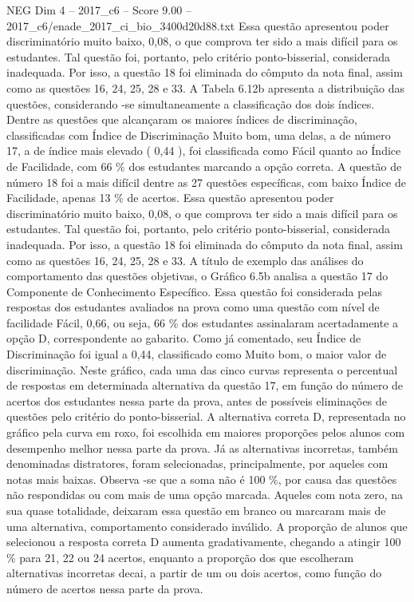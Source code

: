 \begin{textsample}{NEG Dim 4 – 2017\_c6 – Score 9.00 – 2017\_c6/enade\_2017\_ci\_bio\_3400d20d88.txt}
Essa questão apresentou poder discriminatório muito baixo, 0,08, o que comprova ter sido a mais difícil para os estudantes.
Tal questão foi, portanto, pelo critério ponto-bisserial, considerada inadequada.
Por isso, a questão 18 foi eliminada do cômputo da nota final, assim como as questões 16, 24, 25, 28 e 33.
A Tabela 6.12b apresenta a distribuição das questões, considerando -se simultaneamente a classificação dos dois índices.
Dentre as questões que alcançaram os maiores índices de discriminação, classificadas com Índice de Discriminação Muito bom, uma delas, a de número 17, a de índice mais elevado ( 0,44 ), foi classificada como Fácil quanto ao Índice de Facilidade, com 66 \% dos estudantes marcando a opção correta.
A questão de número 18 foi a mais difícil dentre as 27 questões específicas, com baixo Índice de Facilidade, apenas 13 \% de acertos.
Essa questão apresentou poder discriminatório muito baixo, 0,08, o que comprova ter sido a mais difícil para os estudantes.
Tal questão foi, portanto, pelo critério ponto-bisserial, considerada inadequada.
Por isso, a questão 18 foi eliminada do cômputo da nota final, assim como as questões 16, 24, 25, 28 e 33.
A título de exemplo das análises do comportamento das questões objetivas, o Gráfico 6.5b analisa a questão 17 do Componente de Conhecimento Específico.
Essa questão foi considerada pelas respostas dos estudantes avaliados na prova como uma questão com nível de facilidade Fácil, 0,66, ou seja, 66 \% dos estudantes assinalaram acertadamente a opção D, correspondente ao gabarito.
Como já comentado, seu Índice de Discriminação foi igual a 0,44, classificado como Muito bom, o maior valor de discriminação.
Neste gráfico, cada uma das cinco curvas representa o percentual de respostas em determinada alternativa da questão 17, em função do número de acertos dos estudantes nessa parte da prova, antes de possíveis eliminações de questões pelo critério do ponto-bisserial.
A alternativa correta D, representada no gráfico pela curva em roxo, foi escolhida em maiores proporções pelos alunos com desempenho melhor nessa parte da prova.
Já as alternativas incorretas, também denominadas distratores, foram selecionadas, principalmente, por aqueles com notas mais baixas.
Observa -se que a soma não é 100 \%, por causa das questões não respondidas ou com mais de uma opção marcada.
Aqueles com nota zero, na sua quase totalidade, deixaram essa questão em branco ou marcaram mais de uma alternativa, comportamento considerado inválido.
A proporção de alunos que selecionou a resposta correta D aumenta gradativamente, chegando a atingir 100 \% para 21, 22 ou 24 acertos, enquanto a proporção dos que escolheram alternativas incorretas decai, a partir de um ou dois acertos, como função do número de acertos nessa parte da prova.

\end{textsample}
